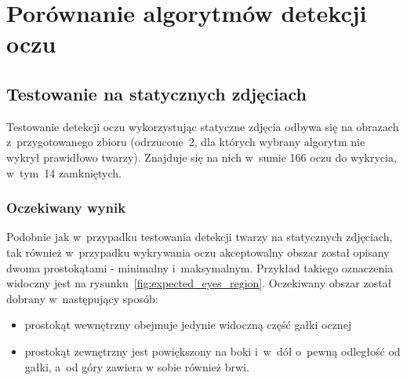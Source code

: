 \newpage

\section{Porównanie algorytmów detekcji oczu}



\subsection{Testowanie na statycznych zdjęciach}

Testowanie detekcji oczu wykorzystując statyczne zdjęcia odbywa się na obrazach z~przygotowanego zbioru (odrzucone~2, dla których wybrany algorytm nie wykrył prawidłowo twarzy). Znajduje się na nich w~sumie 166 oczu do wykrycia, w~tym~14 zamkniętych.

\subsubsection{Oczekiwany wynik}

Podobnie jak w~przypadku testowania detekcji twarzy na statycznych zdjęciach, tak również w~przypadku wykrywania oczu akceptowalny obszar został opisany dwoma prostokątami - minimalny i~maksymalnym. Przykład takiego oznaczenia widoczny jest na rysunku~\ref{fig:expected_eyes_region}. Oczekiwany obszar został dobrany w~następujący sposób:

\begin{itemize}
    \item prostokąt wewnętrzny obejmuje jedynie widoczną część gałki ocznej
    \item prostokąt zewnętrzny jest powiększony na boki i~w~dół o~pewną odległość od gałki, a~od góry zawiera w sobie również brwi.
\end{itemize}

